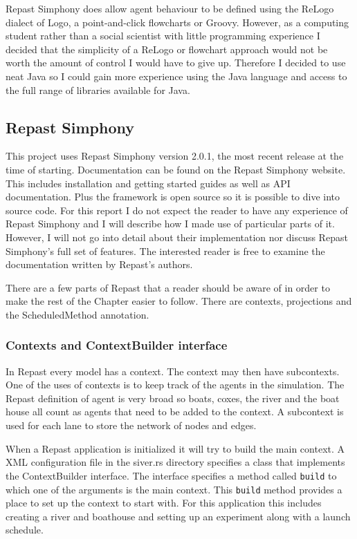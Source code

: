   Repast Simphony does allow agent behaviour to be defined using the
  ReLogo dialect of Logo, a point-and-click flowcharts or
  Groovy. However, as a computing student rather than a social
  scientist with little programming experience I decided that the
  simplicity of a ReLogo or flowchart approach would not be worth the
  amount of control I would have to give up. Therefore I decided to use neat Java so I could gain more
  experience using the Java language and
  access to the full range of libraries available for Java.

  \subsection{Repast Simphony}
  This project uses Repast Simphony version 2.0.1, the most recent
  release at the time of starting. Documentation can be found on the
  Repast Simphony website. This includes installation and getting
  started guides as well as API documentation. Plus the framework is
  open source so it is possible to dive into source code. For this
  report I do not
  expect the reader to have any experience of Repast Simphony and I
  will describe how I made use of
  particular parts of it. However, I will not go into detail about
  their implementation nor discuss Repast Simphony's full set of
  features. The interested reader is free to
  examine the documentation written by Repast's authors.
  
  There are a few parts of Repast that a reader should be aware of in
  order to make the rest of the Chapter easier to follow. There are contexts, projections and the
  ScheduledMethod annotation. 

  \subsubsection{Contexts and ContextBuilder interface}
  In Repast every model has a context. The context may then have
  subcontexts. One of the uses of contexts is to keep track of the
  agents in the simulation. The Repast definition of agent is very
  broad so boats, coxes, the river and the boat house all count as
  agents that need to be added to the context. A subcontext is used
  for each lane to store the network of nodes and edges.

  When a Repast application is initialized it will try to build the
  main context. A XML configuration file in the siver.rs directory
  specifies a class that implements the ContextBuilder interface. The
  interface specifies a method called \texttt{build} to which one of the
  arguments is the main context. This \texttt{build} method provides a
  place to set up the context to start with. For this application this
  includes creating a river and boathouse  and setting up an
  experiment along with a launch schedule.

